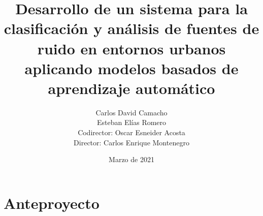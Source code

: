 \documentclass[openany,12pt]{book}
\title{Desarrollo de un sistema para la clasificación y análisis de fuentes de ruido en entornos urbanos aplicando modelos basados de aprendizaje automático}
\author{Carlos David Camacho\\Esteban Elías Romero\\Codirector: Oscar Esneider Acosta\\Director: Carlos Enrique Montenegro}
\date{Marzo de 2021}
\begin{document}
\maketitle
\tableofcontents

\part{Anteproyecto}


 























\medskip

\printbibliography
\end{document}
